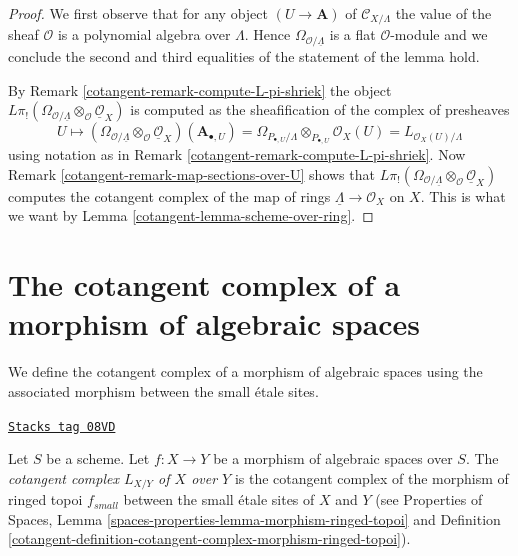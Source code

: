 \begin{proof}

We first observe that for any object $(U \to \mathbf{A})$ of
$\mathcal{C}_{X/\Lambda}$
the value of the sheaf $\mathcal{O}$ is a polynomial algebra over $\Lambda$.
Hence $\Omega_{\mathcal{O}/\underline{\Lambda}}$ is a flat $\mathcal{O}$-module
and we conclude the second and third equalities of the statement of the
lemma hold.

\medskip\noindent
By Remark \ref{cotangent-remark-compute-L-pi-shriek} the object
$L\pi_!(\Omega_{\mathcal{O}/\underline{\Lambda}}
\otimes_\mathcal{O} \underline{\mathcal{O}}_X)$
is computed as the sheafification of the complex of presheaves
$$
U \mapsto
\left(\Omega_{\mathcal{O}/\underline{\Lambda}}
\otimes_\mathcal{O} \underline{\mathcal{O}}_X\right)(\mathbf{A}_{\bullet, U})
=
\Omega_{P_{\bullet, U}/\Lambda} \otimes_{P_{\bullet, U}} \mathcal{O}_X(U) =
L_{\mathcal{O}_X(U)/\Lambda}
$$
using notation as in Remark \ref{cotangent-remark-compute-L-pi-shriek}.
Now Remark \ref{cotangent-remark-map-sections-over-U} shows that
$L\pi_!(\Omega_{\mathcal{O}/\underline{\Lambda}}
\otimes_\mathcal{O} \underline{\mathcal{O}}_X)$
computes the cotangent complex of the map of rings
$\underline{\Lambda} \to \mathcal{O}_X$ on $X$.
This is what we want by Lemma \ref{cotangent-lemma-scheme-over-ring}.
\end{proof}

\section{The cotangent complex of a morphism of algebraic spaces}
\label{cotangent-section-cotangent-morphism-spaces}
We define the cotangent complex of a morphism of algebraic spaces
using the associated morphism between the small \'etale sites.

\begin{definition}
\label{cotangent-definition-cotangent-morphism-spaces}
\href{https://stacks.math.columbia.edu/tag/08VD}{\texttt{Stacks tag 08VD}}

Let $S$ be a scheme. Let $f : X \to Y$ be a morphism of algebraic spaces
over $S$. The {\it cotangent complex $L_{X/Y}$ of $X$ over $Y$} is the
cotangent complex of the morphism of ringed topoi $f_{small}$
between the small \'etale sites of $X$ and $Y$
(see
Properties of Spaces, Lemma
\ref{spaces-properties-lemma-morphism-ringed-topoi}
and
Definition \ref{cotangent-definition-cotangent-complex-morphism-ringed-topoi}).
\end{definition}

